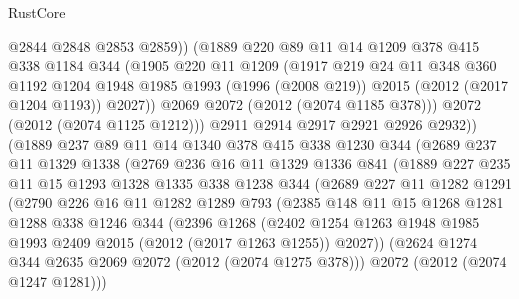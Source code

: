 \begin{lexlean}{RustCore}
\begin{coremodule}
                @2844
                @2848
                @2853
                @2859))
            (@1889
              @220
              @89
              @11
              @14
              @1209
              @378
              @415
              @338
              @1184
              @344
              (@1905
                @220
                @11
                @1209
                (@1917
                  @219
                  @24
                  @11
                  @348
                  @360
                  @1192
                  @1204
                  @1948
                  @1985
                  @1993
                  (@1996 (@2008 @219))
                  @2015
                  (@2012 (@2017 @1204 @1193))
                  @2027))
              @2069
              @2072
              (@2012 (@2074 @1185 @378)))
            @2072
            (@2012 (@2074 @1125 @1212)))
          @2911
          @2914
          @2917
          @2921
          @2926
          @2932))
      (@1889
        @237
        @89
        @11
        @14
        @1340
        @378
        @415
        @338
        @1230
        @344
        (@2689
          @237
          @11
          @1329
          @1338
          (@2769
            @236
            @16
            @11
            @1329
            @1336
            @841
            (@1889
              @227
              @235
              @11
              @15
              @1293
              @1328
              @1335
              @338
              @1238
              @344
              (@2689
                @227
                @11
                @1282
                @1291
                (@2790
                  @226
                  @16
                  @11
                  @1282
                  @1289
                  @793
                  (@2385
                    @148
                    @11
                    @15
                    @1268
                    @1281
                    @1288
                    @338
                    @1246
                    @344
                    (@2396
                      @1268
                      (@2402
                        @1254
                        @1263
                        @1948
                        @1985
                        @1993
                        @2409
                        @2015
                        (@2012 (@2017 @1263 @1255))
                        @2027))
                    (@2624 @1274 @344 @2635 @2069 @2072 (@2012 (@2074 @1275 @378)))
                    @2072
                    (@2012 (@2074 @1247 @1281)))

\end{coremodule}
\end{lexlean}
